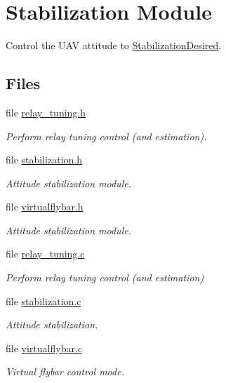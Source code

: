 \hypertarget{group___stabilization_module}{\section{\-Stabilization \-Module}
\label{group___stabilization_module}
}


\-Control the \-U\-A\-V attitude to \hyperlink{group___stabilization_desired}{\-Stabilization\-Desired}.  


\subsection*{\-Files}
\begin{DoxyCompactItemize}
\item 
file \hyperlink{relay__tuning_8h}{relay\-\_\-tuning.\-h}
\begin{DoxyCompactList}\small\item\em \-Perform relay tuning control (and estimation). \end{DoxyCompactList}\item 
file \hyperlink{stabilization_8h}{stabilization.\-h}
\begin{DoxyCompactList}\small\item\em \-Attitude stabilization module. \end{DoxyCompactList}\item 
file \hyperlink{virtualflybar_8h}{virtualflybar.\-h}
\begin{DoxyCompactList}\small\item\em \-Attitude stabilization module. \end{DoxyCompactList}\item 
file \hyperlink{relay__tuning_8c}{relay\-\_\-tuning.\-c}
\begin{DoxyCompactList}\small\item\em \-Perform relay tuning control (and estimation) \end{DoxyCompactList}\item 
file \hyperlink{stabilization_8c}{stabilization.\-c}
\begin{DoxyCompactList}\small\item\em \-Attitude stabilization. \end{DoxyCompactList}\item 
file \hyperlink{virtualflybar_8c}{virtualflybar.\-c}
\begin{DoxyCompactList}\small\item\em \-Virtual flybar control mode. \end{DoxyCompactList}\end{DoxyCompactItemize}
